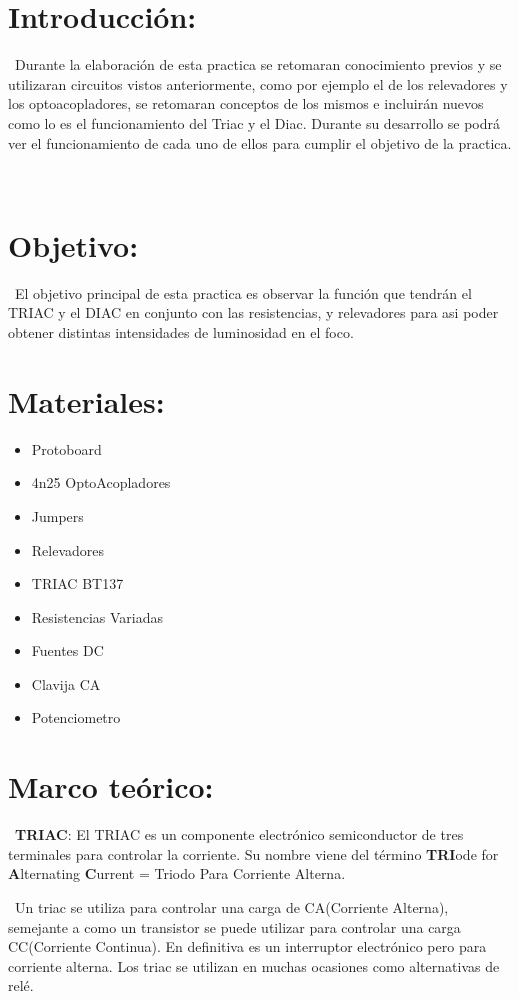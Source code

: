 \documentclass[12pt,letterpaper]{article}
\begin{document}
\newpage

\section{Introducción:}

\
Durante la elaboración de esta practica se retomaran conocimiento previos y se utilizaran circuitos vistos anteriormente, como por ejemplo el de los relevadores y los optoacopladores, se retomaran conceptos de los mismos e incluirán nuevos como lo es el funcionamiento del Triac y el Diac. Durante su desarrollo se podrá ver el funcionamiento de cada uno de ellos para cumplir el objetivo de la practica.

\
\section{Objetivo:}

\
El objetivo principal de esta practica es observar la función que tendrán el TRIAC y el DIAC en conjunto con las resistencias, y relevadores para asi poder obtener distintas intensidades de luminosidad en el foco.

\section{Materiales:}
\begin{itemize}
\item Protoboard
\item 4n25 OptoAcopladores
\item Jumpers
\item Relevadores
\item TRIAC BT137
\item Resistencias Variadas
\item Fuentes DC
\item Clavija CA
\item Potenciometro
\end{itemize}

\section{Marco teórico:}

\
\textbf{TRIAC}: El TRIAC es un componente electrónico semiconductor de tres terminales para controlar la corriente. Su nombre viene del término \textbf{TRI}ode for \textbf{A}lternating \textbf{C}urrent = Triodo Para Corriente Alterna.

\
Un triac se utiliza para controlar una carga de CA(Corriente Alterna), semejante a como un transistor se puede utilizar para controlar una carga CC(Corriente Continua). En definitiva es un interruptor electrónico pero para corriente alterna. Los triac se utilizan en muchas ocasiones como alternativas de relé.
\
\end{document}
